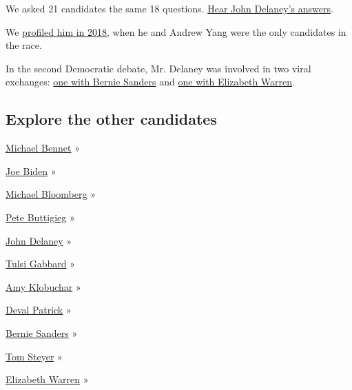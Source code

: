 We asked 21 candidates the same 18 questions.
\href{https://www.nytimes.com/interactive/2019/us/politics/john-delaney-2020-campaign.html}{Hear
John Delaney's answers}.

We
\href{https://www.nytimes.com/2018/11/10/us/politics/john-delaney-2020-iowa.html}{profiled
him in 2018}, when he and Andrew Yang were the only candidates in the
race.

In the second Democratic debate, Mr. Delaney was involved in two viral
exchanges:
\href{https://www.nytimes.com/2019/07/30/us/politics/sanders-delaney-health-care.html}{one
with Bernie Sanders} and
\href{https://www.nytimes.com/2019/07/30/us/politics/elizabeth-warren-debate.html}{one
with Elizabeth Warren}.

\hypertarget{explore-the-other-candidates}{%
\subsection{Explore the other
candidates}\label{explore-the-other-candidates}}

\href{https://www.nytimes.com/interactive/2020/us/elections/michael-bennet.html}{Michael
Bennet} »

\href{https://www.nytimes.com/interactive/2020/us/elections/joe-biden.html}{Joe
Biden} »

\href{https://www.nytimes.com/interactive/2020/us/elections/michael-bloomberg.html}{Michael
Bloomberg} »

\href{https://www.nytimes.com/interactive/2020/us/elections/pete-buttigieg.html}{Pete
Buttigieg} »

\href{https://www.nytimes.com/interactive/2020/us/elections/john-delaney.html}{John
Delaney} »

\href{https://www.nytimes.com/interactive/2020/us/elections/tulsi-gabbard.html}{Tulsi
Gabbard} »

\href{https://www.nytimes.com/interactive/2020/us/elections/amy-klobuchar.html}{Amy
Klobuchar} »

\href{https://www.nytimes.com/interactive/2020/us/elections/deval-patrick.html}{Deval
Patrick} »

\href{https://www.nytimes.com/interactive/2020/us/elections/bernie-sanders.html}{Bernie
Sanders} »

\href{https://www.nytimes.com/interactive/2020/us/elections/tom-steyer.html}{Tom
Steyer} »

\href{https://www.nytimes.com/interactive/2020/us/elections/elizabeth-warren.html}{Elizabeth
Warren} »

